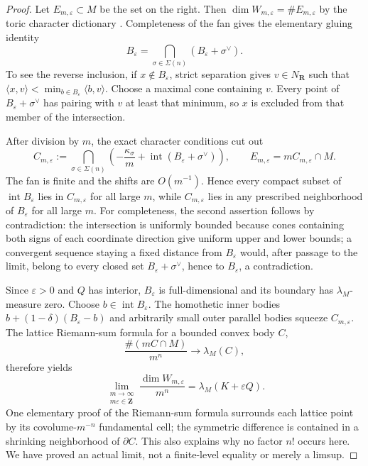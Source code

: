 \begin{proof}
Let \(E_{m,\varepsilon}\subset M\) be the set on the right.  Then
\(\dim W_{m,\varepsilon}=\#E_{m,\varepsilon}\) by the toric character
dictionary \cite[\S4.3]{CLS11}.  Completeness of the fan gives the elementary
gluing identity
\[
 B_\varepsilon
   =\bigcap_{\sigma\in\Sigma(n)}
        (B_\varepsilon+\sigma^\vee).
\]
To see the reverse inclusion, if \(x\notin B_\varepsilon\), strict separation
gives \(v\in N_{\mathbf R}\) such that
\(\langle x,v\rangle<\min_{b\in B_\varepsilon}\langle b,v\rangle\).
Choose a maximal cone containing \(v\).  Every point of
\(B_\varepsilon+\sigma^\vee\) has pairing with \(v\) at least that minimum,
so \(x\) is excluded from that member of the intersection.

After division by \(m\), the exact character conditions cut out
\[
 C_{m,\varepsilon}:=
 \bigcap_{\sigma\in\Sigma(n)}
 \left(-\frac{\kappa_\sigma}{m}
       +\operatorname{int}(B_\varepsilon+\sigma^\vee)\right),
 \qquad
 E_{m,\varepsilon}=mC_{m,\varepsilon}\cap M.
\]
The fan is finite and the shifts are \(O(m^{-1})\).  Hence every compact
subset of \(\operatorname{int}B_\varepsilon\) lies in
\(C_{m,\varepsilon}\) for all large \(m\), while
\(C_{m,\varepsilon}\) lies in any prescribed neighborhood of
\(B_\varepsilon\) for all large \(m\).  For completeness, the second
assertion follows by contradiction: the intersection is uniformly bounded
because cones containing both signs of each coordinate direction give
uniform upper and lower bounds; a convergent sequence staying a fixed
distance from \(B_\varepsilon\) would, after passage to the limit, belong to
every closed set \(B_\varepsilon+\sigma^\vee\), hence to
\(B_\varepsilon\), a contradiction.

Since \(\varepsilon>0\) and \(Q\) has interior, \(B_\varepsilon\) is
full-dimensional and its boundary has \(\lambda_M\)-measure zero.  Choose
\(b\in\operatorname{int}B_\varepsilon\).  The homothetic inner bodies
\(b+(1-\delta)(B_\varepsilon-b)\) and arbitrarily small outer parallel
bodies squeeze \(C_{m,\varepsilon}\).  The lattice Riemann-sum formula for a
bounded convex body \(C\),
\[
             \frac{\#(mC\cap M)}{m^n}\longrightarrow\lambda_M(C),
\]
therefore yields
\[
 \lim_{\substack{m\to\infty\\m\varepsilon\in\mathbf Z}}
 \frac{\dim W_{m,\varepsilon}}{m^n}
       =\lambda_M(K+\varepsilon Q).
\]
One elementary proof of the Riemann-sum formula surrounds each lattice point
by its covolume-\(m^{-n}\) fundamental cell; the symmetric difference is
contained in a shrinking neighborhood of \(\partial C\).  This also explains
why no factor \(n!\) occurs here.  We have proved an actual limit, not a
finite-level equality or merely a limsup.


\end{proof}
